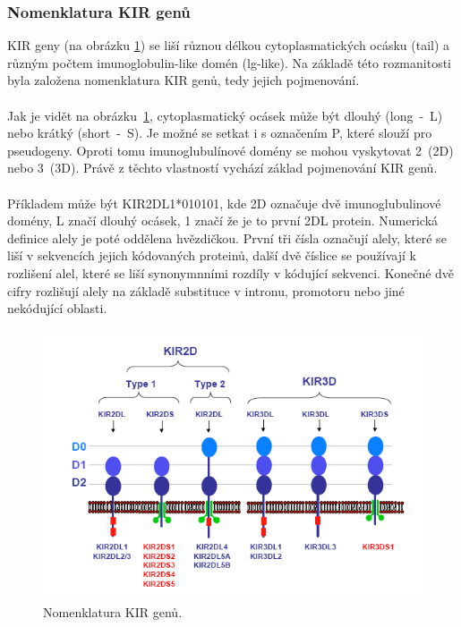 \documentclass[czech,DP]{thesiskiv}
\numberwithin{equation}{section}
\begin{document}
\subsubsection{Nomenklatura KIR genů}
KIR geny (na obrázku \ref{fig:img_kir_nomenklatura}) se liší různou délkou cytoplasmatických ocásku (tail) a různým počtem imunoglobulin-like domén (lg-like). Na základě této rozmanitosti byla založena nomenklatura KIR genů, tedy jejich pojmenování. 
\\
\\
Jak je vidět na obrázku~\ref{fig:img_kir_nomenklatura}, cytoplasmatický ocásek může být dlouhý (long~-~L) nebo krátký (short~-~S). Je možné se setkat i s označením P, které slouží pro pseudogeny. Oproti tomu imunoglubulínové domény se mohou vyskytovat 2~(2D) nebo 3~(3D). Právě z těchto vlastností vychází základ pojmenování KIR genů. 
\\
\\
Příkladem může být KIR2DL1*010101, kde 2D označuje dvě imunoglubulinové domény, L značí dlouhý ocásek, 1 značí že je to první 2DL protein. Numerická definice alely je poté oddělena hvězdičkou. První tři čísla označují alely, které se liší v sekvencích jejich kódovaných proteinů, další dvě číslice se používají k rozlišení alel, které se liší synonymnními rozdíly v kódující sekvenci. Konečné dvě cifry rozlišují alely na základě substituce v intronu, promotoru nebo jiné nekódující oblasti. \cite{imgt_hla_database}

\begin{figure}[H]		
		\centering
		\includegraphics[width=\textwidth]{./img/KIR_nomenklatura.png}
		\caption{Nomenklatura KIR genů. \cite{KIR_transplantace_jindra}}
		\label{fig:img_kir_nomenklatura}
\end{figure}
\end{document}
